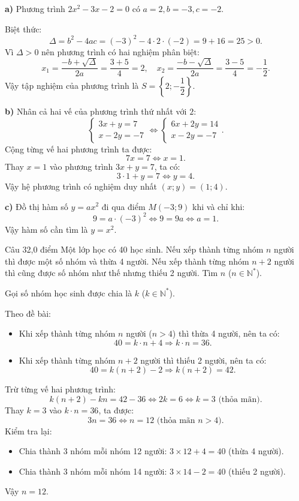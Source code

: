 \begin{loi_giai_cau}
\textbf{a)} Phương trình $2x^2 - 3x - 2 = 0$ có $a=2, b=-3, c=-2$.

Biệt thức:
\[\Delta = b^2 - 4ac = (-3)^2 - 4\cdot 2\cdot (-2) = 9 + 16 = 25 > 0.\]
Vì $\Delta > 0$ nên phương trình có hai nghiệm phân biệt:
\[x_1 = \dfrac{-b+\sqrt{\Delta}}{2a} = \dfrac{3+5}{4} = 2, \quad x_2 = \dfrac{-b-\sqrt{\Delta}}{2a} = \dfrac{3-5}{4} = -\dfrac{1}{2}.\]
Vậy tập nghiệm của phương trình là $S = \left\{2; -\dfrac{1}{2}\right\}$.

\textbf{b)} Nhân cả hai vế của phương trình thứ nhất với $2$:
\[\begin{cases} 3x + y = 7 \\ x - 2y = -7 \end{cases} \Leftrightarrow \begin{cases} 6x + 2y = 14 \\ x - 2y = -7 \end{cases}.\]
Cộng từng vế hai phương trình ta được:
\[7x = 7 \Leftrightarrow x = 1.\]
Thay $x = 1$ vào phương trình $3x + y = 7$, ta có:
\[3\cdot 1 + y = 7 \Leftrightarrow y = 4.\]
Vậy hệ phương trình có nghiệm duy nhất $\boxed{(x; y) = (1; 4)}$.

\textbf{c)} Đồ thị hàm số $y = ax^2$ đi qua điểm $M(-3; 9)$ khi và chỉ khi:
\[9 = a\cdot (-3)^2 \Leftrightarrow 9 = 9a \Leftrightarrow \boxed{a = 1}.\]
Vậy hàm số cần tìm là $y = x^2$.
\end{loi_giai_cau}

\begin{de_cau}{Câu 3}{2,0 điểm}
Một lớp học có 40 học sinh. Nếu xếp thành từng nhóm $n$ người thì được một số nhóm và thừa 4 người. Nếu xếp thành từng nhóm $n+2$ người thì cũng được số nhóm như thế nhưng thiếu 2 người. Tìm $n$ ($n \in \mathbb{N}^*$).
\end{de_cau}

\begin{loi_giai_cau}
Gọi số nhóm học sinh được chia là $k$ ($k \in \mathbb{N}^*$).

Theo đề bài:
\begin{itemize}
  \item Khi xếp thành từng nhóm $n$ người ($n > 4$) thì thừa 4 người, nên ta có:
  \[40 = k\cdot n + 4 \Rightarrow k\cdot n = 36.\]
  \item Khi xếp thành từng nhóm $n+2$ người thì thiếu 2 người, nên ta có:
  \[40 = k(n+2) - 2 \Rightarrow k(n+2) = 42.\]
\end{itemize}
Trừ từng vế hai phương trình:
\[k(n+2) - kn = 42 - 36 \Leftrightarrow 2k = 6 \Leftrightarrow k = 3 \text{ (thỏa mãn)}.\tag{nhận}\]
Thay $k = 3$ vào $k\cdot n = 36$, ta được:
\[3n = 36 \Leftrightarrow n = 12 \text{ (thỏa mãn } n > 4).\]
Kiểm tra lại:
\begin{itemize}
  \item Chia thành 3 nhóm mỗi nhóm 12 người: $3 \times 12 + 4 = 40$ (thừa 4 người).
  \item Chia thành 3 nhóm mỗi nhóm 14 người: $3 \times 14 - 2 = 40$ (thiếu 2 người).
\end{itemize}
Vậy $\boxed{n = 12}$.
\end{loi_giai_cau}


